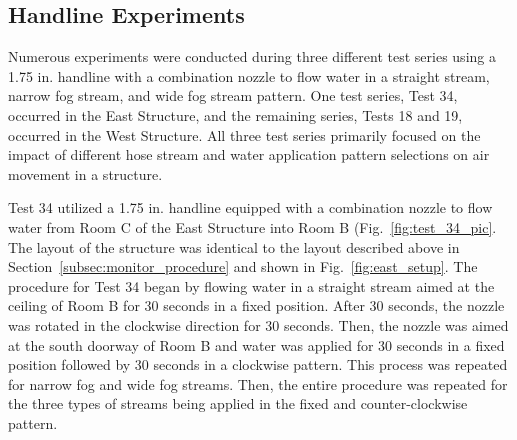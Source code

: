 \documentclass[12pt,oneside]{book}
\begin{document}
\subsection{Handline Experiments}
\label{subsec:handline_procedure}
Numerous experiments were conducted during three different test series using a 1.75 in. handline with a combination nozzle to flow water in a straight stream, narrow fog stream, and wide fog stream pattern. One test series, Test 34, occurred in the East Structure, and the remaining series, Tests 18 and 19, occurred in the West Structure. All three test series primarily focused on the impact of different hose stream and water application pattern selections on air movement in a structure. 

Test 34 utilized a 1.75 in. handline equipped with a combination nozzle to flow water from Room C of the East Structure into Room B (Fig.~\ref{fig:test_34_pic}. The layout of the structure was identical to the layout described above in Section~\ref{subsec:monitor_procedure} and shown in Fig.~\ref{fig:east_setup}. The procedure for Test 34 began by flowing water in a straight stream aimed at the ceiling of Room B for 30 seconds in a fixed position. After 30 seconds, the nozzle was rotated in the clockwise direction for 30 seconds. Then, the nozzle was aimed at the south doorway of Room B and water was applied for 30 seconds in a fixed position followed by 30 seconds in a clockwise pattern. This process was repeated for narrow fog and wide fog streams. Then, the entire procedure was repeated for the three types of streams being applied in the fixed and counter-clockwise pattern.
\end{document}
